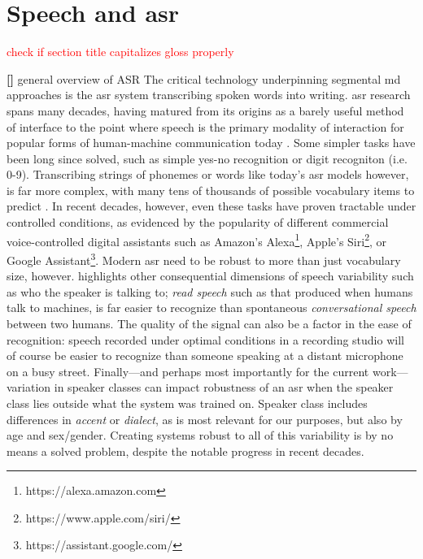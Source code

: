 \documentclass[thesis]{cluu}
\newcounter{paranum}
\newcommand{\numberedparagraph}{\par\refstepcounter{paranum}\textbf{[\theparanum] }}
\newcommand{\todo}[1]{\textcolor{red}{#1}}
\begin{document}
\section{Speech and \Gls{asr} }
\todo{check if section title capitalizes gloss properly}
\numberedparagraph{general overview of ASR}
The critical technology underpinning segmental \gls{md} approaches is the \gls{asr} system transcribing spoken words into writing. \gls{asr} research spans many decades, having matured from its origins as a barely useful method of interface to the point where speech is the primary modality of interaction for popular forms of human-machine communication today \parencite{yuAutomaticSpeechRecognition2015}. Some simpler tasks have been long since solved, such as simple yes-no recognition or digit recogniton (i.e. 0-9). Transcribing strings of phonemes or words like today's \gls{asr} models however, is far more complex, with many tens of thousands of possible vocabulary items to predict \parencite{jurafskySpeechLanguageProcessing2025}. In recent decades, however, even these tasks have proven tractable under controlled conditions, as evidenced by the popularity of different commercial voice-controlled digital assistants such as Amazon's Alexa\footnote{https://alexa.amazon.com}, Apple's Siri\footnote{https://www.apple.com/siri/}, or Google Assistant\footnote{https://assistant.google.com/}. Modern \gls{asr} need to be robust to more than just vocabulary size, however. \textcite{jurafskySpeechLanguageProcessing2025} highlights other consequential dimensions of speech variability such as who the speaker is talking to; \textit{read speech} such as that produced when humans talk to machines, is far easier to recognize than spontaneous \textit{conversational speech} between two humans. The quality of the signal can also be a factor in the ease of recognition: speech recorded under optimal conditions in a recording studio will of course be easier to recognize than someone speaking at a distant microphone on a busy street. Finally---and perhaps most importantly for the current work---variation in speaker classes can impact robustness of an \gls{asr} when the speaker class lies outside what the system was trained on. Speaker class includes differences in \textit{accent} or \textit{dialect}, as is most relevant for our purposes, but also by age and sex/gender. Creating systems robust to all of this variability is by no means a solved problem, despite the notable progress in recent decades.
\end{document}
